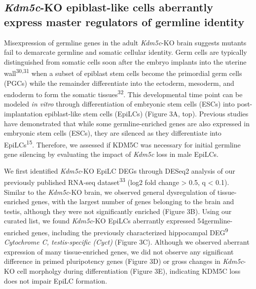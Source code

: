 \documentclass[
]{article}
\begin{document}
\hypertarget{kdm5c-ko-epiblast-like-cells-aberrantly-express-master-regulators-of-germline-identity}{%
\subsection{\texorpdfstring{\emph{Kdm5c}-KO epiblast-like cells
aberrantly express master regulators of germline
identity}{Kdm5c-KO epiblast-like cells aberrantly express master regulators of germline identity}}\label{kdm5c-ko-epiblast-like-cells-aberrantly-express-master-regulators-of-germline-identity}}

Misexpression of germline genes in the adult \emph{Kdm5c}-KO brain
suggests mutants fail to demarcate germline and somatic cellular
identity. Germ cells are typically distinguished from somatic cells soon
after the embryo implants into the uterine wall\textsuperscript{30,31}
when a subset of epiblast stem cells become the primordial germ cells
(PGCs) while the remainder differentiate into the ectoderm, mesoderm,
and endoderm to form the somatic tissues\textsuperscript{32}. This
developmental time point can be modeled \emph{in vitro} through
differentiation of embryonic stem cells (ESCs) into post-implantation
epiblast-like stem cells (EpiLCs) (Figure 3A, top). Previous studies
have demonstrated that while some germline-enriched genes are also
expressed in embryonic stem cells (ESCs), they are silenced as they
differentiate into EpiLCs\textsuperscript{15}. Therefore, we assessed if
KDM5C was necessary for initial germline gene silencing by evaluating
the impact of \emph{Kdm5c} loss in male EpiLCs.

We first identified \emph{Kdm5c}-KO EpiLC DEGs through DESeq2 analysis
of our previously published RNA-seq dataset\textsuperscript{33} (log2
fold change \textgreater{} 0.5, q \textless{} 0.1). Similar to the
\emph{Kdm5c}-KO brain, we observed general dysregulation of
tissue-enriched genes, with the largest number of genes belonging to the
brain and testis, although they were not significantly enriched (Figure
3B). Using our curated list, we found \emph{Kdm5c}-KO EpiLCs aberrantly
expressed 54germline-enriched genes, including the previously
characterized hippocampal DEG\textsuperscript{9} \emph{Cytochrome C,
testis-specific (Cyct)} (Figure 3C). Although we observed aberrant
expression of many tissue-enriched genes, we did not observe any
significant difference in primed pluripotency genes (Figure 3D) or gross
changes in \emph{Kdm5c}-KO cell morpholgy during differentiation (Figure
3E), indicating KDM5C loss does not impair EpiLC formation.
\end{document}
